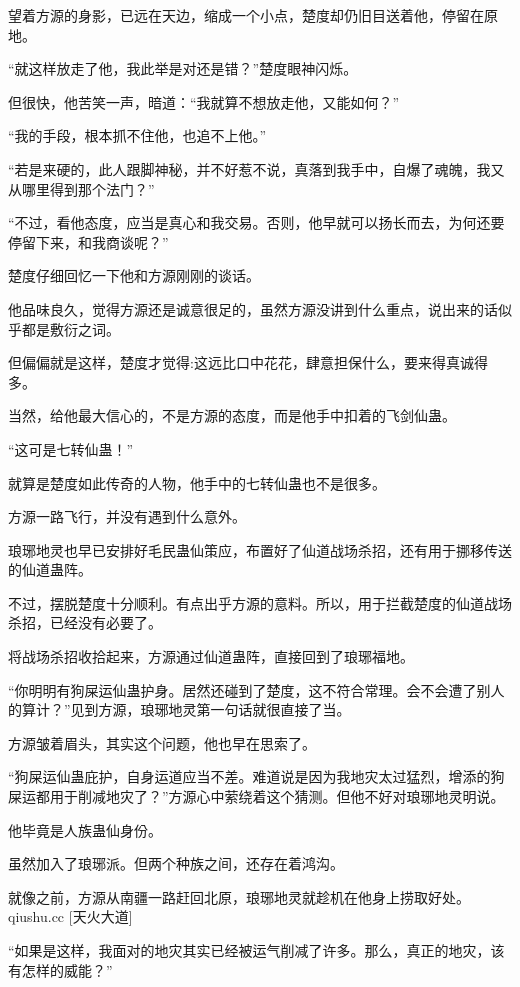 
\begin{this_body}

望着方源的身影，已远在天边，缩成一个小点，楚度却仍旧目送着他，停留在原地。

“就这样放走了他，我此举是对还是错？”楚度眼神闪烁。

但很快，他苦笑一声，暗道：“我就算不想放走他，又能如何？”

“我的手段，根本抓不住他，也追不上他。”

“若是来硬的，此人跟脚神秘，并不好惹不说，真落到我手中，自爆了魂魄，我又从哪里得到那个法门？”

“不过，看他态度，应当是真心和我交易。否则，他早就可以扬长而去，为何还要停留下来，和我商谈呢？”

楚度仔细回忆一下他和方源刚刚的谈话。

他品味良久，觉得方源还是诚意很足的，虽然方源没讲到什么重点，说出来的话似乎都是敷衍之词。

但偏偏就是这样，楚度才觉得:这远比口中花花，肆意担保什么，要来得真诚得多。

当然，给他最大信心的，不是方源的态度，而是他手中扣着的飞剑仙蛊。

“这可是七转仙蛊！”

就算是楚度如此传奇的人物，他手中的七转仙蛊也不是很多。

方源一路飞行，并没有遇到什么意外。

琅琊地灵也早已安排好毛民蛊仙策应，布置好了仙道战场杀招，还有用于挪移传送的仙道蛊阵。

不过，摆脱楚度十分顺利。有点出乎方源的意料。所以，用于拦截楚度的仙道战场杀招，已经没有必要了。

将战场杀招收拾起来，方源通过仙道蛊阵，直接回到了琅琊福地。

“你明明有狗屎运仙蛊护身。居然还碰到了楚度，这不符合常理。会不会遭了别人的算计？”见到方源，琅琊地灵第一句话就很直接了当。

方源皱着眉头，其实这个问题，他也早在思索了。

“狗屎运仙蛊庇护，自身运道应当不差。难道说是因为我地灾太过猛烈，增添的狗屎运都用于削减地灾了？”方源心中萦绕着这个猜测。但他不好对琅琊地灵明说。

他毕竟是人族蛊仙身份。

虽然加入了琅琊派。但两个种族之间，还存在着鸿沟。

就像之前，方源从南疆一路赶回北原，琅琊地灵就趁机在他身上捞取好处。qiushu.cc [天火大道]

“如果是这样，我面对的地灾其实已经被运气削减了许多。那么，真正的地灾，该有怎样的威能？”


\end{this_body}
